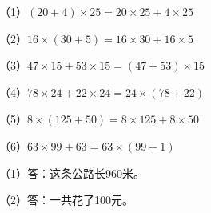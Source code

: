 
\begingroup\color{answerred}\noindent（1）$(20+4)\times25=20\times25+4\times25$\par
\noindent（2）$16\times(30+5)=16\times30+16\times5$\par
\noindent（3）$47\times15+53\times15=(47+53)\times15$\par
\noindent（4）$78\times24+22\times24=24\times(78+22)$\par
\noindent（5）$8\times(125+50)=8\times125+8\times50$\par
\noindent（6）$63\times99+63=63\times(99+1)$\par\par\endgroup
{}
\begingroup\color{answerred}\par\endgroup
{}
\begingroup\color{answerred}\noindent（1）答：这条公路长960米。\par
\noindent（2）答：一共花了100元。\par\par\endgroup
